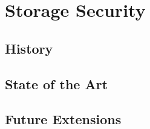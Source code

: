 \documentclass{sig-alternate}
\begin{document}
\section{Storage Security}
\label{sec:fs}

\subsection{History}

\subsection{State of the Art}

\subsection{Future Extensions}


\end{document}
